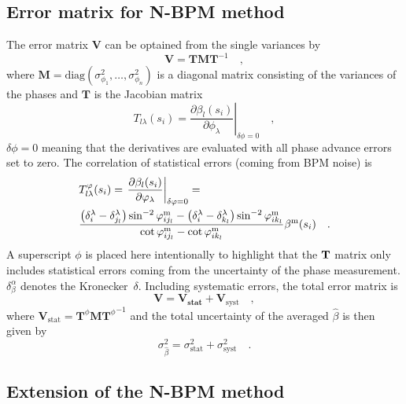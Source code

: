 \subsection{Error matrix for N-BPM method}

The error matrix $ \mathbf{V} $ can be optained from the single variances by
%
\begin{equation}
\mathbf{V} = \mathbf{T}\mathbf{M}\mathbf{T}^{-1}\quad ,
\label{eq:V}
\end{equation}
%
where $ \mathbf{M}=\text{diag}(\sigma^2_{\phi_1}, \ldots, \sigma^2_{\phi_n}) $ is a diagonal matrix consisting of the variances of the phases and $ \mathbf{T} $ is the Jacobian matrix
%
\begin{equation}
T_{l\lambda}(s_i) = \left.\frac{\partial \beta_l(s_i)}{\partial \phi_\lambda} \right|_{\delta\phi=0}\quad ,
\label{eq:Tij}
\end{equation}
%
$ \delta\phi=0 $ meaning that the derivatives are evaluated with all phase advance errors set to zero. The correlation of statistical errors (coming from BPM noise) is
%
\begin{align}
&T_{l\lambda}^\varphi(s_i) = \left.\frac{\partial \beta_l(s_i)}{\partial \varphi_\lambda}\right|_{\delta \varphi =0} =\notag\\ 
&\frac{
		\left(\delta_{i}^\lambda-\delta_{j_l}^\lambda\right)\sin^{-2}\varphi^\text{m}_{i{j_l}} -
		\left(\delta_{i}^\lambda-\delta_{k_l}^\lambda\right)\sin^{-2}\varphi_{i{k_l}}^\text{m}
	}
	{
		\cot \varphi_{i{j_l}}^\text{m} - \cot\varphi_{i{k_l}}^\text{m}
	}
\beta^\text{m}(s_i)\quad .
\label{eq:Tphiij}
\end{align}
%
A superscript $ \phi $ is placed here intentionally to highlight that the $ \mathbf{T} $ matrix only includes statistical errors coming from the uncertainty of the phase measurement. $\delta^\alpha_\beta $ denotes the Kronecker~$\delta$. Including systematic errors, the total error matrix is
%
\begin{equation}
\mathbf{V} = \mathbf{V_\text{stat}} + \mathbf{V}_\text{syst}\quad ,
\label{eq:V1}
\end{equation}
%
where $ \mathbf{V}_\text{stat} = \mathbf{T}^\phi \mathbf{M} {\mathbf{T}^{\phi}}^{-1}$ and the total uncertainty of the averaged $ \hat{\beta} $ is then given by
%
\begin{equation}
\sigma_{\hat{\beta}}^2 = \sigma_\text{stat}^2 + \sigma_\text{syst}^2\quad .
\end{equation}
%
\subsection{Extension of the N-BPM method}

